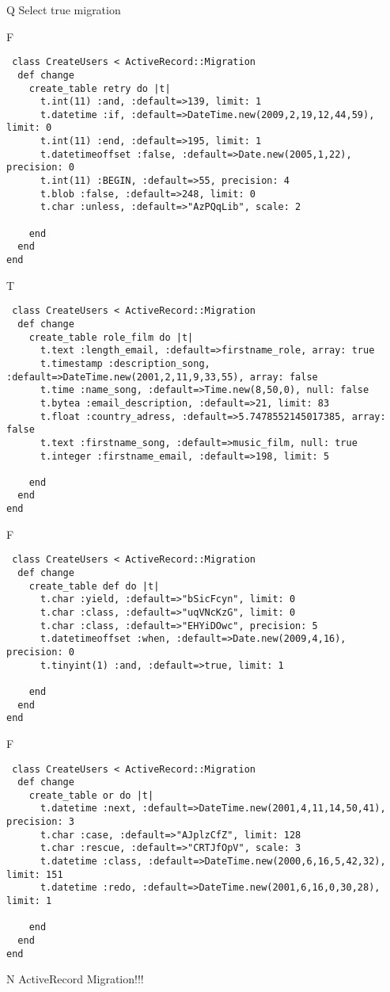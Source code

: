 Q
Select true migration

F
\begin{verbatim}
 class CreateUsers < ActiveRecord::Migration 
  def change 
    create_table retry do |t| 
      t.int(11) :and, :default=>139, limit: 1
      t.datetime :if, :default=>DateTime.new(2009,2,19,12,44,59), limit: 0
      t.int(11) :end, :default=>195, limit: 1
      t.datetimeoffset :false, :default=>Date.new(2005,1,22), precision: 0
      t.int(11) :BEGIN, :default=>55, precision: 4
      t.blob :false, :default=>248, limit: 0
      t.char :unless, :default=>"AzPQqLib", scale: 2
   
    end 
  end 
end
\end{verbatim}

T
\begin{verbatim}
 class CreateUsers < ActiveRecord::Migration 
  def change 
    create_table role_film do |t| 
      t.text :length_email, :default=>firstname_role, array: true
      t.timestamp :description_song, :default=>DateTime.new(2001,2,11,9,33,55), array: false
      t.time :name_song, :default=>Time.new(8,50,0), null: false
      t.bytea :email_description, :default=>21, limit: 83
      t.float :country_adress, :default=>5.7478552145017385, array: false
      t.text :firstname_song, :default=>music_film, null: true
      t.integer :firstname_email, :default=>198, limit: 5
   
    end 
  end 
end
\end{verbatim}

F
\begin{verbatim}
 class CreateUsers < ActiveRecord::Migration 
  def change 
    create_table def do |t| 
      t.char :yield, :default=>"bSicFcyn", limit: 0
      t.char :class, :default=>"uqVNcKzG", limit: 0
      t.char :class, :default=>"EHYiDOwc", precision: 5
      t.datetimeoffset :when, :default=>Date.new(2009,4,16), precision: 0
      t.tinyint(1) :and, :default=>true, limit: 1
   
    end 
  end 
end
\end{verbatim}

F
\begin{verbatim}
 class CreateUsers < ActiveRecord::Migration 
  def change 
    create_table or do |t| 
      t.datetime :next, :default=>DateTime.new(2001,4,11,14,50,41), precision: 3
      t.char :case, :default=>"AJplzCfZ", limit: 128
      t.char :rescue, :default=>"CRTJfOpV", scale: 3
      t.datetime :class, :default=>DateTime.new(2000,6,16,5,42,32), limit: 151
      t.datetime :redo, :default=>DateTime.new(2001,6,16,0,30,28), limit: 1
   
    end 
  end 
end
\end{verbatim}
N
ActiveRecord Migration!!!
  
